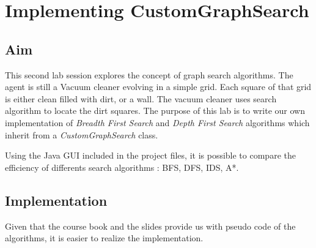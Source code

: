 \section{Implementing CustomGraphSearch}
 \thispagestyle{empty}
\subsection{Aim}

This second lab session explores the concept of graph search algorithms. The
agent is still a Vacuum cleaner evolving in a simple grid.
Each square of that grid is either clean filled with dirt, or a wall.
The vacuum cleaner uses search algorithm to locate the dirt squares.
The purpose of this lab is to write our own implementation of
\textit{Breadth First Search} and \textit{Depth First Search} algorithms which
inherit from a \textit{CustomGraphSearch} class.

Using the Java GUI included in the project files, it is possible to compare the
efficiency of differents search algorithms : BFS, DFS, IDS, A*.


\subsection{Implementation}

Given that the course book and the slides provide us with pseudo code of the
algorithms, it is easier to realize the implementation.



